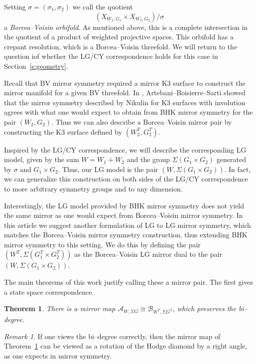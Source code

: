 \documentclass[10pt, letterpaper]{amsart}
\newtheorem{thm}{Theorem}%
\theoremstyle{remark}
\newtheorem{rem}{Remark}[thm]
\newcommand{\sA}{\mathscr{A}}
\newcommand{\sB}{\mathscr{B}}
\newcommand{\s}[1]{\Sigma #1}
\DeclareMathOperator{\SL}{SL}
\begin{document}
Setting $\sigma=(\sigma_1,\sigma_2)$ we call the quotient 
\[
(X_{W_1,G_1}\times X_{W_2,G_2})/\sigma 
\]
a \emph{Borcea--Voisin orbifold}. As mentioned above, this is a complete intersection in the quotient of a product of weighted projective spaces. This orbifold has a crepant resolution, which is a Borcea--Voisin threefold. We will return to the question iof whether the LG/CY correspondence holds for this case in Section~\ref{s:geometry}.

Recall that BV mirror symmetry required a mirror K3 surface to construct the mirror manifold for a given BV threefold. In \cite{involutions}, Artebani--Boisierre--Sarti showed that the mirror symmetry described by Nikulin for K3 surfaces with involution agrees with what one would expect to obtain from BHK mirror symmetry for the pair $(W_2,G_2)$. Thus we can also describe a Borcea--Voisin mirror pair by constructing the K3 surface defined by $(W_2^T, G_2^T)$. 

Inspired by the LG/CY correspondence, we will describe the corresponding LG model, given by the sum $W=W_1+W_2$ and the group $\s{(G_1\times G_2)}$ generated by $\sigma$ and $G_1\times G_2$. Thus, our LG model is the pair $(W, \s{(G_1\times G_2)})$. In fact, we can generalize this construction on both sides of the LG/CY correspondence to more arbitrary symmetry groups and to any dimension.

Interestingly, the LG model provided by BHK mirror symmetry does not yield the same mirror as one would expect from Borcea--Voisin mirror symmetry. In this article we suggest another formulation of LG to LG mirror symmetry, which matches the Borcea--Voisin mirror symmetry construction, thus extending BHK mirror symmetry to this setting. We do this by defining the pair $(W^T,\s{(G_1^T\times G_2^T)})$ as the Borcea--Voisin LG mirror dual to the pair $(W, \s{(G_1\times G_2)})$.

The main theorems of this work justify calling these a mirror pair. The first gives a state space correspondence. 

\begin{thm}\label{t:BViso}
There is a mirror map $\sA_{W,\s{G}}\cong \sB_{W^T,\s{G^T}}$, which preserves the bi--degree. 
\end{thm}

\begin{rem}
	If one views the bi--degree correctly, then the mirror map of Theorem~\ref{t:BViso} can be viewed as a rotation of the Hodge diamond by a right angle, as one expects in mirror symmetry.
\end{rem}
\end{document}
